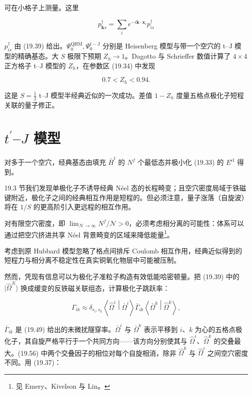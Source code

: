 可在小格子上测量。这里

\begin{equation*}
p _ {\mathbf {k} s} ^ {\dagger} = \sum_ {i} e ^ {- i \mathbf {k} \cdot \mathbf {x} _ {i}} p _ {is} ^ {\dagger}
\tag{19.54}
\end{equation*}

$p_{is}^{\dagger}$ 由 (19.39) 给出。$\Psi_{0}^{\mathrm{QHM}}, \Psi_{0}^{\mathrm{t-J}}$ 分别是 Heisenberg 模型与带一个空穴的 t--J 模型的精确基态。大 $S$ 极限下预期 $Z_{h} \rightarrow 1$。Dagotto 与 Schrieffer 数值计算了 $4 \times 4$ 正方格子 t--J 模型的 $Z_{h}$，在参数区 (19.34) 中发现

\begin{equation*}
0. 7 < Z _ {h} < 0. 94.
\tag{19.55}
\end{equation*}

这是 $S = \frac{1}{2}$ t--J 模型半经典近似的一次成功。差值 $1 - Z_{h}$ 度量五格点极化子短程关联的量子修正。

\section{$t^{\prime}$--$J$ 模型}

对多于一个空穴，经典基态由填充 $\bar{H}^{t}$ 的 $N^{f}$ 个最低态并极小化 (19.33) 的 $E^{cl}$ 得到。

19.3 节我们发现单极化子不诱导经典 Néel 态的长程畸变；且空穴密度局域于铁磁键附近，极化子之间的经典相互作用是短程的。但必须注意，量子涨落（自旋波）将在 $1/S$ 的更高阶引入更远程的相互作用。

对有限空穴密度，即 $\lim_{\mathcal{N}\to\infty}N^{f}/\mathcal{N}>0$，必须考虑相分离的可能性：体系可以通过把空穴挤进共享 Néel 背景畸变的区域来降低能量\footnote{见 Emery、Kivelson 与 Lin。}。

考虑到原 Hubbard 模型忽略了格点间排斥 Coulomb 相互作用，经典近似得到的短程力与相分离不稳定性在真实铜氧化物层中可能被压制。

然而，凭现有信息可以为极化子准粒子构造有效低能哈密顿量。把 (19.39) 中的 $|\hat{\Omega}^{N}\rangle$ 换成缓变的反铁磁关联组态，计算极化子跳跃率：

\begin{equation*}
\Gamma_{ik} \approx \delta_{s _ {i}, s _ {k}} \left\langle \hat {\Omega} ^ {i} \middle| \bar {\Omega} ^ {i} \right\rangle \bar {\Gamma} _ {ik} \left\langle \bar {\Omega} ^ {k} \middle| \hat {\Omega} ^ {k} \right\rangle ,
\tag{19.56}
\end{equation*}

$\bar{\Gamma}_{ik}$ 是 (19.49) 给出的未微扰隧穿率。$\bar{\Omega}^{i}$ 与 $\bar{\Omega}^{k}$ 表示平移到 $i$、$k$ 为心的五格点极化子，其自旋严格平行于一个共同方向——该方向分别使其与 $\hat{\Omega}^{i}$、$\hat{\Omega}^{k}$ 的交叠最大。(19.56) 中两个交叠因子的相位对每个自旋相消，除非 $\hat{\Omega}^{k}$ 与 $\hat{\Omega}^{i}$ 之间空穴密度不同。用 (19.37)：

